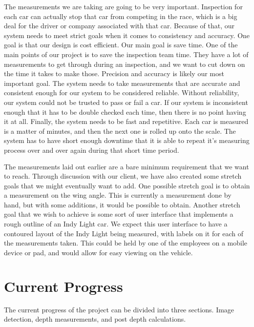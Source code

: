 \documentclass[onecolumn, draftclsnofoot,10pt, compsoc]{IEEEtran}
\begin{document}
\noindent The measurements we are taking are going to be very important.  Inspection for each car can actually stop that car from competing in the race, which is a big deal for the driver or company associated with that car.  Because of that, our system needs to meet strict goals when it comes to consistency and accuracy. One goal is that our design is cost efficient. Our main goal is save time.  One of the main points of our project is to save the inspection team time.  They have a lot of measurements to get through during an inspection, and we want to cut down on the time it takes to make those.  Precision and accuracy is likely our most important goal.  The system needs to take measurements that are accurate and consistent enough for our system to be considered reliable.  Without reliability, our system could not be trusted to pass or fail a car.  If our system is inconsistent enough that it has to be double checked each time, then there is no point having it at all.  Finally, the system needs to be fast and repetitive.  Each car is measured is a matter of minutes, and then the next one is rolled up onto the scale.  The system has to have short enough downtime that it is able to repeat it’s measuring process over and over again during that short time period.

\newline

\noindent The measurements laid out earlier are a bare minimum requirement that we want to reach.  Through discussion with our client, we have also created some stretch goals that we might eventually want to add.  One possible stretch goal is to obtain a measurement on the wing angle.  This is currently a measurement done by hand, but with some additions, it would be possible to obtain.  Another stretch goal that we wish to achieve is some sort of user interface that implements a rough outline of an Indy Light car.  We expect this user interface to have a contoured layout of the Indy Light being measured, with labels on it for each of the measurements taken.  This could be held by one of the employees on a mobile device or pad, and would allow for easy viewing on the vehicle.

\section{Current Progress}
The current progress of the project can be divided into three sections.  Image detection, depth measurements, and post depth calculations.
\end{document}
